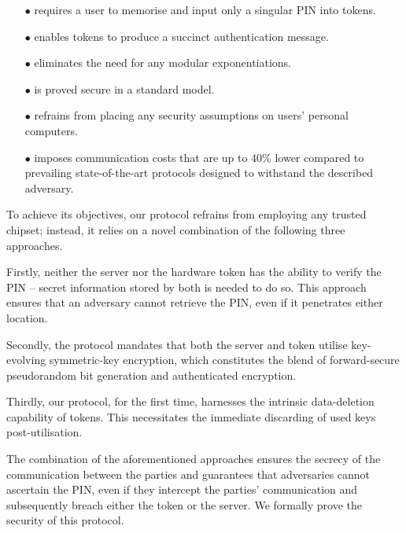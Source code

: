 \begin{itemize}
\item[$\bullet$] requires a user to memorise and input only a singular PIN into tokens.

\item[$\bullet$] enables tokens to produce a succinct authentication message.

\item[$\bullet$] eliminates the need for any modular exponentiations.

\item[$\bullet$] is proved secure in a standard model.

\item[$\bullet$] refrains from placing any security assumptions on users' personal computers.

\item[$\bullet$]  imposes communication costs that are up to 40\% lower compared to prevailing state-of-the-art protocols designed to withstand the described adversary. 


\end{itemize}

To achieve its objectives, our protocol refrains from employing any trusted chipset; instead, it relies on a novel combination of the following three approaches. 

Firstly, neither the server nor the hardware token has the ability to verify the PIN -- secret information stored by both is needed to do so. This approach ensures that an adversary cannot retrieve the PIN, even if it penetrates either location. 


Secondly, the protocol mandates that both the server and token utilise key-evolving symmetric-key encryption, which constitutes the blend of forward-secure pseudorandom bit generation and authenticated encryption. 

Thirdly, our protocol, for the first time, harnesses the intrinsic data-deletion capability of tokens. This necessitates the immediate discarding of used keys post-utilisation. 

The combination of the aforementioned approaches ensures the secrecy of the communication between the parties and guarantees that adversaries cannot ascertain the PIN, even if they intercept the parties' communication and subsequently breach either the token or the server. We formally prove the security of this protocol. 





